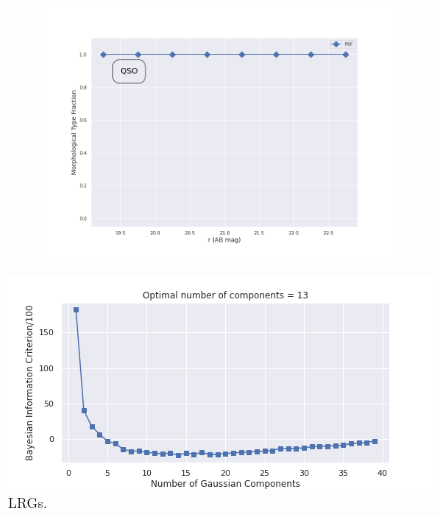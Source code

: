 \begin{figure}
\begin{subfigure}{.5\textwidth}
\caption{}
\end{subfigure}
\begin{subfigure}{.5\textwidth}
\centering
\includegraphics[width=1\linewidth]{images/gmm/qso_morph.png}
\caption{}
\end{subfigure}
\end{figure}

\begin{figure}
  \centering
  \includegraphics[width=\textwidth]{images/gmm/lrgDev_bic.png}
  \caption{LRGs.}
  \label{fig:lrg_bic}
\end{figure}

